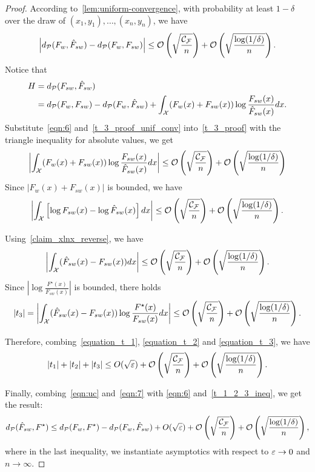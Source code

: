 \begin{proof}
According to~\cref{lem:uniform-convergence}, 
with probability at least $1-\delta$ over the draw of $(x_1,y_1),\dots,(x_n, y_n)$, we have
\begin{align} \label{t_3_proof_unif_conv}
    \left|d_{\mathcal{P}}(F_w, \hat{F}_{sw}) - d_{\mathcal{P}}(F_w, F_{sw}) \right| \le \mathcal{O}\left(\sqrt{\frac{\mathcal{C}_{\mathcal{F}}}{n}}\right) + \mathcal{O}\left(\sqrt{\frac{\log(1/\delta)}{n}}\right).
\end{align}
Notice that 
\begin{align} \label{t_3_proof}
H & = d_{\mathcal{P}}(F_{sw}, \hat{F}_{sw}) \nonumber \\ & = d_{\mathcal{P}}(F_w, F_{sw}) - d_{\mathcal{P}}(F_w, \hat{F}_{sw}) + \int_{\mathcal{X}} (F_w(x)+F_{sw}(x))\log \frac{F_{sw}(x)}{\hat{F}_{sw}(x)} d x.
\end{align}
Substitute~\eqref{eqn:6} and~\eqref{t_3_proof_unif_conv} into~\cref{t_3_proof} with the triangle inequality for absolute values, we get
\begin{align*}
    \left| \int_{\mathcal{X}} (F_w(x)+F_{sw}(x))\log \frac{F_{sw}(x)}{\hat{F}_{sw}(x)} d x \right| \le \mathcal{O}\left(\sqrt{\frac{\mathcal{C}_{\mathcal{F}}}{n}}\right) + \mathcal{O}\left(\sqrt{\frac{\log(1/\delta)}{n}}\right)
\end{align*}
Since $\left| F_w(x)+F_{sw}(x) \right|$ is bounded, we have
$$\left| \int_{\mathcal{X}} \left[ \log F_{sw}(x)- \log \hat{F}_{sw}(x) \right] d x \right| \le \mathcal{O}\left(\sqrt{\frac{\mathcal{C}_{\mathcal{F}}}{n}}\right) + \mathcal{O}\left(\sqrt{\frac{\log(1/\delta)}{n}}\right).$$

Using~\cref{claim_xlnx_reverse}, we have
$$\left| \int_{\mathcal{X}} (\hat{F}_{sw}(x)-F_{sw}(x)) d x \right| \le \mathcal{O}\left(\sqrt{\frac{\mathcal{C}_{\mathcal{F}}}{n}}\right) + \mathcal{O}\left(\sqrt{\frac{\log(1/\delta)}{n}}\right).$$
Since $\left| \log \frac{F^\star(x)}{F_{sw}(x)} \right|$ is bounded, there holds
\begin{align} \label{equation_t_3}
    |t_3| = \left| \int_{\mathcal{X}} (\hat{F}_{sw}(x)-F_{sw}(x)) \log \frac{F^\star(x)}{F_{sw}(x)} d x  \right| \le \mathcal{O}\left(\sqrt{\frac{\mathcal{C}_{\mathcal{F}}}{n}}\right) + \mathcal{O}\left(\sqrt{\frac{\log(1/\delta)}{n}}\right).
\end{align}

Therefore, combing~\eqref{equation_t_1}, \eqref{equation_t_2} and \eqref{equation_t_3}, we have
\begin{align} \label{t_1_2_3_ineq}
    |t_1| + |t_2| + |t_3| \le O(\sqrt{\varepsilon}) + \mathcal{O}\left(\sqrt{\frac{\mathcal{C}_{\mathcal{F}}}{n}}\right) + \mathcal{O}\left(\sqrt{\frac{\log(1/\delta)}{n}}\right).
\end{align}


Finally, combing~\eqref{eqn:uc} and~\eqref{eqn:7} with \eqref{eqn:6} and~\eqref{t_1_2_3_ineq}, we get the result:
\begin{align*}
d_\mathcal{P}(\hat{F}_{sw}, F^\star) \le d_\mathcal{P}(F_w, F^\star) - d_\mathcal{P}(F_w, \hat{F}_{sw}) + O(\sqrt{\varepsilon}) + \mathcal{O}\left(\sqrt{\frac{\mathcal{C}_{\mathcal{F}}}{n}}\right) + \mathcal{O}\left(\sqrt{\frac{\log(1/\delta)}{n}}\right),
\end{align*}
where in the last inequality, we instantiate asymptotics with respect to $\varepsilon \to 0$ and $n \to \infty$.
\end{proof}




